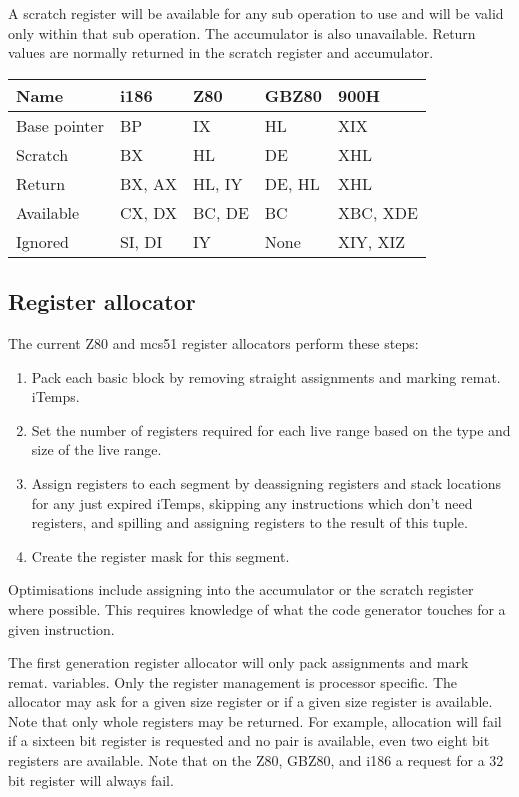 \documentclass{article}
\begin{document}
A scratch register will be available for any sub operation to use and
will be valid only within that sub operation.  The accumulator is also
unavailable.  Return values are normally returned in the scratch
register and accumulator.

\begin{tabular}{l|l|l|l|l}
	Name		& i186	  & Z80	    & GBZ80  & 900H 	\\ \hline
	Base pointer 	& BP	  & IX	    & HL     & XIX 	\\ \hline
	Scratch		& BX	  & HL	    & DE     & XHL	\\ \hline
	Return		& BX, AX  & HL, IY  & DE, HL & XHL	\\ \hline
	Available	& CX, DX  & BC, DE  & BC     & XBC, XDE	\\ \hline
	Ignored		& SI, DI  & IY	    & None   & XIY, XIZ	\\
\end{tabular}

\subsection{Register allocator}
The current Z80 and mcs51 register allocators perform these steps:
\begin{enumerate}
	\item Pack each basic block by removing straight assignments and marking
remat. iTemps.
	\item Set the number of registers required for each live range based on
the type and size of the live range.
	\item Assign registers to each segment by deassigning registers and stack
locations for any just expired iTemps, skipping any instructions which don't need
registers, and spilling and assigning registers to the result of this tuple.
	\item Create the register mask for this segment.
\end{enumerate}

Optimisations include assigning into the accumulator or the scratch
register where possible.  This requires knowledge of what the code
generator touches for a given instruction.

The first generation register allocator will only pack assignments and mark
remat. variables.  Only the register management is processor specific.  The
allocator may ask for a given size register or if a given size register is
available.  Note that only whole registers may be returned.  For example, 
allocation will fail if a sixteen bit register is requested and no pair
is available, even two eight bit registers are available.  Note that on
the Z80, GBZ80, and i186 a request for a 32 bit register will always fail.
\end{document}
